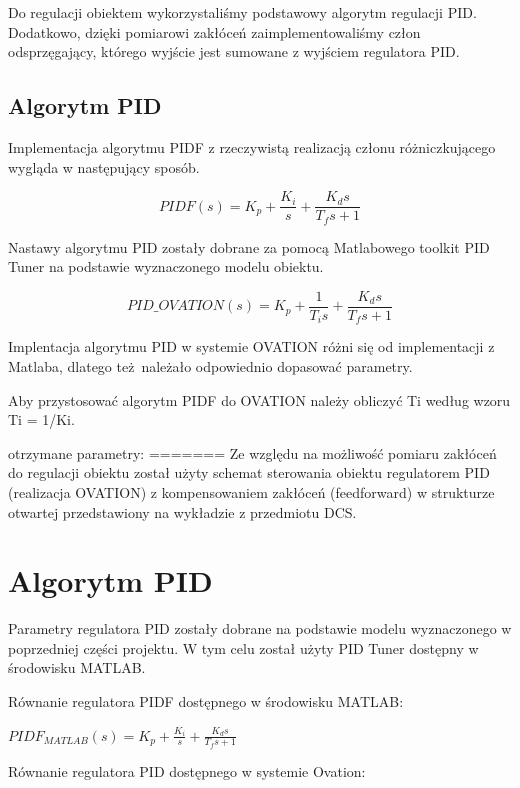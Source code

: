 \documentclass{mwrep}
\begin{document}
Do regulacji obiektem wykorzystaliśmy podstawowy algorytm regulacji PID. Dodatkowo, dzięki pomiarowi zakłóceń zaimplementowaliśmy
człon odsprzęgający, którego wyjście jest sumowane z wyjściem regulatora PID.

\subsection{Algorytm PID}
\label{PID}

Implementacja algorytmu PIDF z rzeczywistą realizacją członu różniczkującego wygląda w następujący sposób.

$$PIDF(s) = K _ { p } + \frac { K _ { i } } { s } + \frac { K _ { d } s } { T _ { f } s + 1 }$$

Nastawy algorytmu PID zostały dobrane za pomocą Matlabowego toolkit PID Tuner na podstawie wyznaczonego modelu obiektu.




$$PID\_OVATION(s) = K _ { p } + \frac { 1 } {  T _ { i } s } + \frac { K _ { d } s } { T _ { f } s + 1 }$$

Implentacja algorytmu PID w systemie OVATION różni się od implementacji z Matlaba, dlatego też należało odpowiednio dopasować
parametry.

Aby przystosować algorytm PIDF do OVATION należy obliczyć Ti według wzoru Ti = 1/Ki.

otrzymane parametry:
=======
Ze względu na możliwość pomiaru zakłóceń do regulacji obiektu został użyty schemat sterowania obiektu regulatorem PID (realizacja OVATION) z kompensowaniem zakłóceń (feedforward) w strukturze otwartej przedstawiony na wykładzie z przedmiotu DCS.

\section{Algorytm PID}
\label{PID}

Parametry regulatora PID zostały dobrane na podstawie modelu wyznaczonego w poprzedniej części projektu. W tym celu został użyty PID Tuner dostępny w środowisku MATLAB.

Równanie regulatora PIDF dostępnego w środowisku MATLAB:

\vspace{2mm}
$PIDF_{MATLAB}(s) = K _ { p } + \frac { K _ { i } } { s } + \frac { K _ { d } s } { T _ { f } s + 1 }$
\vspace{3mm}

Równanie regulatora PID dostępnego w systemie Ovation:
\vspace{2mm}
\end{document}
